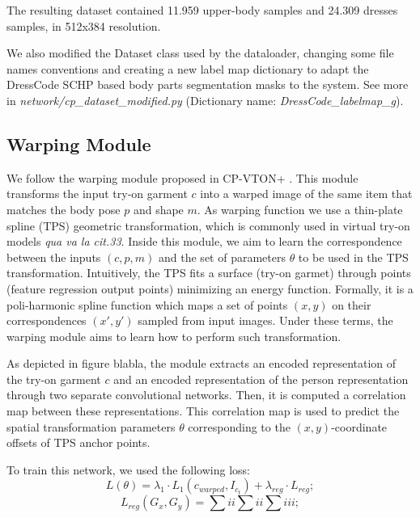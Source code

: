 The resulting dataset contained 11.959 upper-body samples and 24.309 dresses samples, in 512x384 resolution. 

We also modified the Dataset class used by the dataloader, changing some file names conventions and creating a new label map dictionary to adapt the DressCode SCHP based body parts segmentation masks to the system. See more in \textit{network/cp\_dataset\_modified.py} (Dictionary name: \textit{DressCode\_labelmap\_g}).

\subsection{Warping Module}
We follow the warping module proposed in CP-VTON+ \cite{CP-VTON+}.
This module transforms the input try-on garment $c$ into a warped image of the same item that matches the body pose $p$ and shape $m$. As warping function we use a thin-plate spline (TPS) geometric transformation, which is commonly used in virtual
try-on models \textit{qua va la cit.33}.  Inside this module, we aim to learn the correspondence between the inputs $(c, p, m)$ and the set of parameters $\theta$ to be used in the TPS transformation. Intuitively, the TPS fits a surface (try-on garmet) through points (feature regression output points) minimizing an energy function. Formally, it is a poli-harmonic spline function which maps a set of points $(x,y)$ on their correspondences $(x',y')$ sampled from input images. Under these terms, the warping module aims to learn how to perform such transformation.

As depicted in figure blabla, the module extracts an encoded representation of the try-on garment $c$ and an encoded representation of the person representation through two separate convolutional networks.
Then, it is computed a correlation map between these representations.
This correlation map is used to predict the spatial transformation parameters $\theta$ corresponding to the $(x,y)$-coordinate offsets of TPS anchor points. 

To train this network, we used the following loss:
\begin{equation}
L(\theta) = \lambda_1 \cdot L_1(c_{warped}, I_{c_t}) + \lambda_{reg} \cdot L_{reg} ;
\end{equation} 
\begin{equation}
L_{reg}(G_x, G_y) = \sum{i}{i}\sum{i}{i}\sum{i}{i}i ;
\end{equation}


